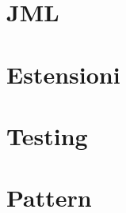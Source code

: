 \providecommand{\main}{.}


\newcommand{\bs}{\textbackslash}






{\hypersetup{hidelinks}
  \tableofcontents  %
}

\chapter{JML}


\chapter{Estensioni}


\chapter{Testing}


\chapter{Pattern}



\appendix
%



